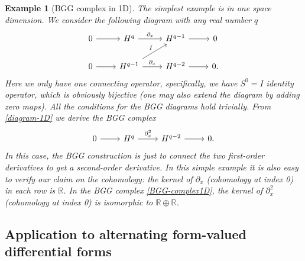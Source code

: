 \documentclass[final]{amsart}%
\newtheorem{example}{Example}
\newcommand{\0}{\mathaccent23}
\begin{document}
\begin{example}[BGG complex in 1D]
The simplest example is in one space dimension. We consider the following diagram with any real number $q$
 \begin{equation}\label{diagram-1D}
\begin{tikzcd}
0 \arrow{r} &H^{q}  \arrow{r}{\partial_{x}} &H^{q-1} \arrow{r}{} & 0\\
0 \arrow{r} &H^{q-1}\arrow{r}{\partial_{x}} \arrow[ur, "I"]&H^{q-2}  \arrow{r}{} & 0.
 \end{tikzcd}
\end{equation}
Here we only have one connecting operator, specifically, we have $S^0= I$ identity operator, which is obviously bijective (one may also extend the diagram by adding zero maps). All the conditions for the BGG diagrams hold trivially. From \eqref{diagram-1D} we derive the BGG complex 
\begin{equation}\label{BGG-complex1D}
\begin{tikzcd}
0 \arrow{r} &H^{q}  \arrow{r}{\partial_{x}^{2}} &H^{q-2} \arrow{r}{} & 0.
 \end{tikzcd}
\end{equation}
In this case, the BGG construction is just to connect the two first-order derivatives to get a second-order derivative. In this simple example it is also easy to verify our claim on the cohomology: the kernel of $\partial_{x}$ (cohomology at index 0) in each row is $\mathbb{R}$. In the BGG complex \eqref{BGG-complex1D}, the kernel of $\partial_{x}^{2}$ (cohomology at index 0) is isomorphic to $\mathbb{R}\oplus \mathbb{R}$.
\end{example}

\subsection{Application to alternating form-valued differential forms}
\end{document}
